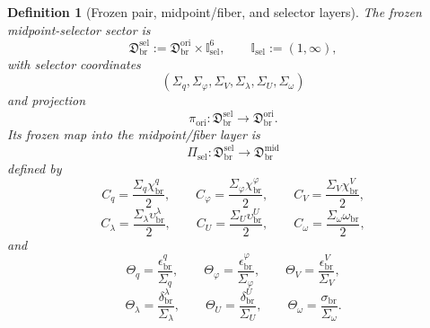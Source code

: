 \documentclass[11pt]{article}
\newcommand{\OriginSector}{\mathfrak D_{\mathrm{br}}^{\mathrm{ori}}}
\newcommand{\AbsReadAmp}{\chi_{\mathrm{br}}^{q}}
\newcommand{\AbsCovAmp}{\chi_{\mathrm{br}}^{\varphi}}
\newcommand{\AbsRelaxAmp}{\chi_{\mathrm{br}}^{V}}
\newcommand{\AbsWellAmp}{\upsilon_{\mathrm{br}}^{\lambda}}
\newcommand{\AbsEqAmp}{\upsilon_{\mathrm{br}}^{U}}
\newcommand{\AbsScaleAmp}{\omega_{\mathrm{br}}}
\newcommand{\PolRead}{\epsilon_{\mathrm{br}}^{q}}
\newcommand{\PolCov}{\epsilon_{\mathrm{br}}^{\varphi}}
\newcommand{\PolRelax}{\epsilon_{\mathrm{br}}^{V}}
\newcommand{\PolWell}{\delta_{\mathrm{br}}^{\lambda}}
\newcommand{\PolEq}{\delta_{\mathrm{br}}^{U}}
\newcommand{\PolScale}{\sigma_{\mathrm{br}}}
\newcommand{\MidFiberSector}{\mathfrak D_{\mathrm{br}}^{\mathrm{mid}}}
\newcommand{\MidRead}{C_{q}}
\newcommand{\MidCov}{C_{\varphi}}
\newcommand{\MidRelax}{C_{V}}
\newcommand{\MidWell}{C_{\lambda}}
\newcommand{\MidEq}{C_{U}}
\newcommand{\MidScale}{C_{\omega}}
\newcommand{\FiberRead}{\Theta_{q}}
\newcommand{\FiberCov}{\Theta_{\varphi}}
\newcommand{\FiberRelax}{\Theta_{V}}
\newcommand{\FiberWell}{\Theta_{\lambda}}
\newcommand{\FiberEq}{\Theta_{U}}
\newcommand{\FiberScale}{\Theta_{\omega}}
\newcommand{\MidSelSector}{\mathfrak D_{\mathrm{br}}^{\mathrm{sel}}}
\newcommand{\MidSelMap}{\Pi_{\mathrm{sel}}}
\newcommand{\SelProj}{\pi_{\mathrm{ori}}}
\newcommand{\SelDom}{\mathbb I_{\mathrm{sel}}}
\newcommand{\SelRead}{\Sigma_{q}}
\newcommand{\SelCov}{\Sigma_{\varphi}}
\newcommand{\SelRelax}{\Sigma_{V}}
\newcommand{\SelWell}{\Sigma_{\lambda}}
\newcommand{\SelEq}{\Sigma_{U}}
\newcommand{\SelScale}{\Sigma_{\omega}}
\newtheorem{definition}{Definition}
\begin{document}
\begin{definition}[Frozen pair, midpoint/fiber, and selector layers]
The frozen midpoint-selector sector is
\begin{equation}
\MidSelSector
:=
\OriginSector\times\SelDom^{6},
\qquad
\SelDom:=(1,\infty),
\label{eq:selsector}
\end{equation}
with selector coordinates
\begin{equation}
(\SelRead,\SelCov,\SelRelax,\SelWell,\SelEq,\SelScale)
\label{eq:selcoords}
\end{equation}
and projection
\begin{equation}
\SelProj:\MidSelSector\longrightarrow\OriginSector.
\label{eq:selproj}
\end{equation}
Its frozen map into the midpoint/fiber layer is
\begin{equation}
\MidSelMap:\MidSelSector\longrightarrow\MidFiberSector
\label{eq:selmap}
\end{equation}
defined by
\begin{equation}
\MidRead=\frac{\SelRead\AbsReadAmp}{2},
\qquad
\MidCov=\frac{\SelCov\AbsCovAmp}{2},
\qquad
\MidRelax=\frac{\SelRelax\AbsRelaxAmp}{2},
\label{eq:selmidA}
\end{equation}
\begin{equation}
\MidWell=\frac{\SelWell\AbsWellAmp}{2},
\qquad
\MidEq=\frac{\SelEq\AbsEqAmp}{2},
\qquad
\MidScale=\frac{\SelScale\AbsScaleAmp}{2},
\label{eq:selmidB}
\end{equation}
and
\begin{equation}
\FiberRead=\frac{\PolRead}{\SelRead},
\qquad
\FiberCov=\frac{\PolCov}{\SelCov},
\qquad
\FiberRelax=\frac{\PolRelax}{\SelRelax},
\label{eq:selfiberA}
\end{equation}
\begin{equation}
\FiberWell=\frac{\PolWell}{\SelWell},
\qquad
\FiberEq=\frac{\PolEq}{\SelEq},
\qquad
\FiberScale=\frac{\PolScale}{\SelScale}.
\label{eq:selfiberB}
\end{equation}
\end{definition}
\end{document}

